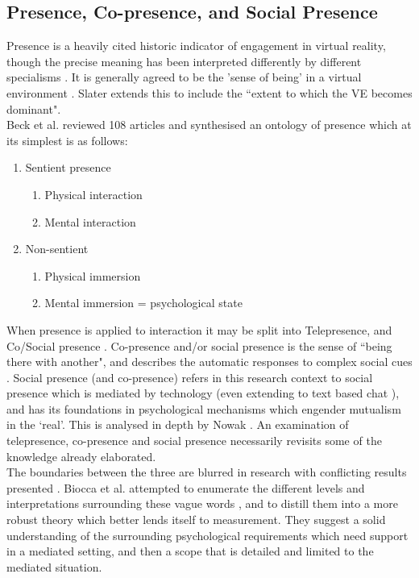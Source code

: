         \subsection{Presence, Co-presence, and Social Presence}
            Presence is a heavily cited historic indicator of engagement in virtual reality, though the precise meaning has been interpreted differently by different specialisms \cite{Beck2011, Schuemie2001}. It is generally agreed to be the 'sense of being' in a virtual environment \cite{Slater1999}. Slater extends this to include the ``extent to which the VE becomes dominant". \\
Beck et al. reviewed 108 articles and synthesised an ontology of presence \cite{Beck2011} which at its simplest is as follows:
            \begin{enumerate}
				\item Sentient presence
                    \begin{enumerate}
                     \item Physical interaction
                      \item Mental interaction
                    \end{enumerate}
                   \item Non-sentient
                   \begin{enumerate}
                       \item Physical immersion
                       \item Mental immersion = psychological state
                     \end{enumerate}
            \end{enumerate}
When presence is applied to interaction it may be split into Telepresence, and Co/Social presence  \cite{heeter1992being, Biocca1997}.  Co-presence and/or social presence is the sense of ``being there with another", and describes the automatic responses to complex social cues \cite{doi:10.1080/01449299508914633, fulk1987social, haythornthwaite1995work}.    Social presence (and co-presence) refers in this research context to social presence which is mediated by technology (even extending to text based chat \cite{Gunawardena1997}), and has its foundations in psychological mechanisms which engender mutualism in the `real'. This is analysed in depth by Nowak \cite{Nowak2001}. An examination of telepresence, co-presence and social presence necessarily revisits some of the knowledge already elaborated.\\
        The boundaries between the three are blurred in research with conflicting results presented \cite{Bulu2012}. Biocca et al. attempted to enumerate the different levels and interpretations surrounding these vague words \cite{Biocca2003}, and to distill them into a more robust theory which better lends itself to measurement. They suggest a solid understanding of the surrounding psychological requirements which need support in a mediated setting, and then a scope that is detailed and limited to the mediated situation.\\
